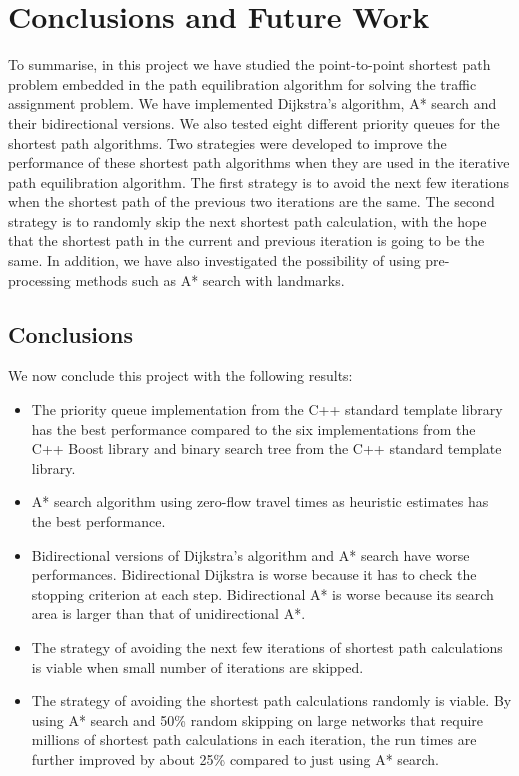\chapter{Conclusions and Future Work} \label{chap:conclusions}
To summarise,
in this project we have studied the point-to-point shortest path problem embedded in the path equilibration algorithm for solving the traffic assignment problem.
We have implemented Dijkstra's algorithm, A* search and their bidirectional versions.
We also tested eight different priority queues for the shortest path algorithms.
Two strategies were developed to improve the performance of these shortest path algorithms when they are used in the iterative path equilibration algorithm.
The first strategy is to avoid the next few iterations
when the shortest path of the previous two iterations are the same.
The second strategy is to randomly skip the next shortest path calculation,
with the hope that the shortest path in the current and previous iteration is going to be the same.
In addition,
we have also investigated the possibility of using pre-processing methods such as A* search with landmarks.

\section{Conclusions}
We now conclude this project with the following results:
\begin{itemize}
    \item The priority queue implementation from the C++ standard template library has the best performance compared to the six implementations from the C++ Boost library and binary search tree from the C++ standard template library.
    \item A* search algorithm using zero-flow travel times as heuristic estimates has the best performance.
    \item Bidirectional versions of Dijkstra's algorithm and A* search have worse performances. Bidirectional Dijkstra is worse because it has to check the stopping criterion at each step. Bidirectional A* is worse because its search area is larger than that of unidirectional A*.
    \item The strategy of avoiding the next few iterations of shortest path calculations is viable when small number of iterations are skipped.
    \item The strategy of avoiding the shortest path calculations randomly is viable. By using A* search and 50\% random skipping on large networks that require millions of shortest path calculations in each iteration, the run times are further improved by about 25\% compared to just using A* search.
\end{itemize}

